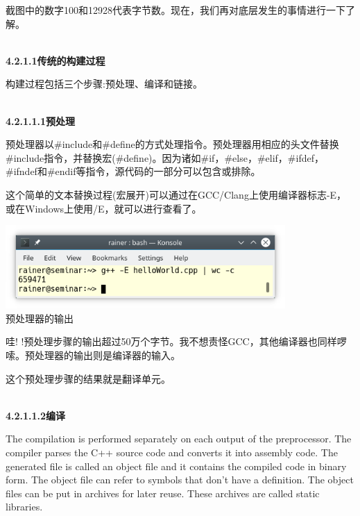 截图中的数字100和12928代表字节数。现在，我们再对底层发生的事情进行一下了解。

\hspace*{\fill} \\ %
\noindent
\textbf{4.2.1.1\hspace{0.2cm}传统的构建过程}

构建过程包括三个步骤:预处理、编译和链接。

\hspace*{\fill} \\ %
\noindent
\textbf{4.2.1.1.1\hspace{0.2cm}预处理}

预处理器以\#include和\#define的方式处理指令。预处理器用相应的头文件替换\#include指令，并替换宏(\#define)。因为诸如\#if，\#else，\#elif，\#ifdef，\#ifndef和\#endif等指令，源代码的一部分可以包含或排除。

这个简单的文本替换过程(宏展开)可以通过在GCC/Clang上使用编译器标志-E，或在Windows上使用/E，就可以进行查看了。

\begin{center}
\includegraphics[width=0.8\textwidth]{content/3/chapter4/images/13.png}\\
预处理器的输出
\end{center}

哇! !预处理步骤的输出超过50万个字节。我不想责怪GCC，其他编译器也同样啰嗦。预处理器的输出则是编译器的输入。

这个预处理步骤的结果就是翻译单元。

\hspace*{\fill} \\ %
\noindent
\textbf{4.2.1.1.2\hspace{0.2cm}编译}

The compilation is performed separately on each output of the preprocessor. The compiler parses the C++ source code and converts it into assembly code. The generated file is called an object file and it contains the compiled code in binary form. The object file can refer to symbols that don’t have a definition. The object files can be put in archives for later reuse. These archives are called static libraries.

